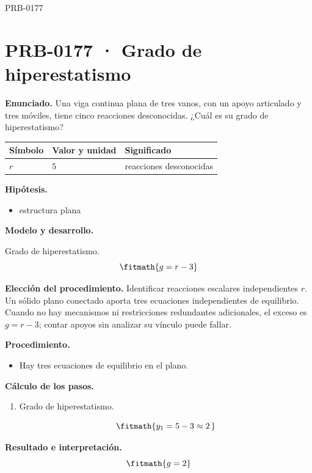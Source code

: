 \begin{studiumworked}{PRB-0177}

\section{PRB-0177 · Grado de hiperestatismo}

\textbf{Enunciado.} Una viga continua plana de tres vanos, con un apoyo articulado y tres móviles, tiene cinco reacciones desconocidas. ¿Cuál es su grado de hiperestatismo?

\par\medskip\noindent\begin{tabular}{@{}p{.18\linewidth}p{.26\linewidth}p{.48\linewidth}@{}}
\toprule Símbolo & Valor y unidad & Significado\\\midrule
$r$ & $5$ & reacciones desconocidas\\
\bottomrule\end{tabular}\par\medskip

\textbf{Hipótesis.}\begin{itemize}\item estructura plana\end{itemize}

\textbf{Modelo y desarrollo.}

Grado de hiperestatismo.\[\fitmath{g = r - 3}\]

\textbf{Elección del procedimiento.} Identificar reacciones escalares independientes $r$. Un sólido plano conectado aporta tres ecuaciones independientes de equilibrio. Cuando no hay mecanismos ni restricciones redundantes adicionales, el exceso es $g=r-3$; contar apoyos sin analizar su vínculo puede fallar.

\textbf{Procedimiento.}\begin{itemize}\item Hay tres ecuaciones de equilibrio en el plano.\end{itemize}

\textbf{Cálculo de los pasos.}

\begin{enumerate}

\item Grado de hiperestatismo.

\[\fitmath{y_{1}=5-3\approx 2\,}\]

\end{enumerate}

\textbf{Resultado e interpretación.}\[\fitmath{g = 2}\]


\end{studiumworked}
